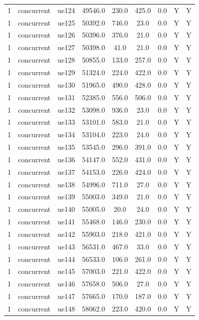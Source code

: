 \begin{table}[ht]
\begin{tabular}{|c|c|c|c|c|c|c|c|c|}
1 & concurrent & ue124 & 49546.0 & 230.0 & 425.0 & 0.0 & Y & Y \\
1 & concurrent & ue125 & 50392.0 & 746.0 & 23.0 & 0.0 & Y & Y \\
1 & concurrent & ue126 & 50396.0 & 376.0 & 21.0 & 0.0 & Y & Y \\
1 & concurrent & ue127 & 50398.0 & 41.0 & 21.0 & 0.0 & Y & Y \\
1 & concurrent & ue128 & 50855.0 & 133.0 & 257.0 & 0.0 & Y & Y \\
1 & concurrent & ue129 & 51324.0 & 224.0 & 422.0 & 0.0 & Y & Y \\
1 & concurrent & ue130 & 51965.0 & 490.0 & 428.0 & 0.0 & Y & Y \\
1 & concurrent & ue131 & 52385.0 & 556.0 & 506.0 & 0.0 & Y & Y \\
1 & concurrent & ue132 & 53098.0 & 936.0 & 23.0 & 0.0 & Y & Y \\
1 & concurrent & ue133 & 53101.0 & 583.0 & 21.0 & 0.0 & Y & Y \\
1 & concurrent & ue134 & 53104.0 & 223.0 & 24.0 & 0.0 & Y & Y \\
1 & concurrent & ue135 & 53545.0 & 296.0 & 391.0 & 0.0 & Y & Y \\
1 & concurrent & ue136 & 54147.0 & 552.0 & 431.0 & 0.0 & Y & Y \\
1 & concurrent & ue137 & 54153.0 & 226.0 & 424.0 & 0.0 & Y & Y \\
1 & concurrent & ue138 & 54996.0 & 711.0 & 27.0 & 0.0 & Y & Y \\
1 & concurrent & ue139 & 55003.0 & 349.0 & 21.0 & 0.0 & Y & Y \\
1 & concurrent & ue140 & 55005.0 & 20.0 & 24.0 & 0.0 & Y & Y \\
1 & concurrent & ue141 & 55468.0 & 146.0 & 230.0 & 0.0 & Y & Y \\
1 & concurrent & ue142 & 55903.0 & 218.0 & 421.0 & 0.0 & Y & Y \\
1 & concurrent & ue143 & 56531.0 & 467.0 & 33.0 & 0.0 & Y & Y \\
1 & concurrent & ue144 & 56533.0 & 106.0 & 261.0 & 0.0 & Y & Y \\
1 & concurrent & ue145 & 57003.0 & 221.0 & 422.0 & 0.0 & Y & Y \\
1 & concurrent & ue146 & 57658.0 & 506.0 & 27.0 & 0.0 & Y & Y \\
1 & concurrent & ue147 & 57665.0 & 170.0 & 187.0 & 0.0 & Y & Y \\
1 & concurrent & ue148 & 58062.0 & 223.0 & 420.0 & 0.0 & Y & Y \\

\end{tabular}
\end{table}
